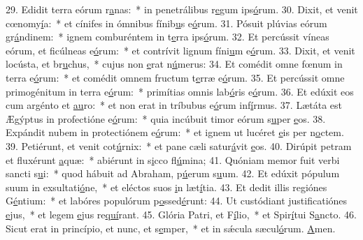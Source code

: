 29. Edidit terra eórum r\uline{a}nas:~* in penetrálibus r\uline{e}gum ips\uline{ó}rum.
30. Dixit, et venit cœnomy\uline{í}a:~* et cínifes in ómnibus fínib\uline{u}s e\uline{ó}rum.
31. Pósuit plúvias eórum gr\uline{á}ndinem:~* ignem comburéntem in t\uline{e}rra ips\uline{ó}rum.
32. Et percússit víneas eórum, et ficúlneas e\uline{ó}rum:~* et contrívit lignum fíni\uline{u}m e\uline{ó}rum.
33. Dixit, et venit locústa, et br\uline{u}chus,~* cujus non \uline{e}rat n\uline{ú}merus:
34. Et comédit omne fœnum in terra e\uline{ó}rum:~* et comédit omnem fructum t\uline{e}rræ e\uline{ó}rum.
35. Et percússit omne primogénitum in terra e\uline{ó}rum:~* primítias omnis lab\uline{ó}ris e\uline{ó}rum.
36. Et edúxit eos cum argénto et \uline{au}ro:~* et non erat in tríbubus e\uline{ó}rum inf\uline{í}rmus.
37. Lætáta est Ægýptus in profectióne e\uline{ó}rum:~* quia incúbuit timor eórum s\uline{u}per \uline{e}os.
38. Expándit nubem in protectiónem e\uline{ó}rum:~* et ignem ut lucéret \uline{e}is per n\uline{o}ctem.
39. Petiérunt, et venit cot\uline{ú}rnix:~* et pane cæli satur\uline{á}vit \uline{e}os.
40. Dirúpit petram et fluxérunt \uline{a}quæ:~* abiérunt in s\uline{i}cco fl\uline{ú}mina;
41. Quóniam memor fuit verbi sancti s\uline{u}i:~* quod hábuit ad Abraham, p\uline{ú}erum s\uline{u}um.
42. Et edúxit pópulum suum in exsultati\uline{ó}ne,~* et eléctos suos \uline{i}n læt\uline{í}tia.
43. Et dedit illis regiónes G\uline{é}ntium:~* et labóres populórum p\uline{o}ssed\uline{é}runt:
44. Ut custódiant justificatiónes \uline{e}jus,~* et legem \uline{e}jus re\uline{quí}rant.
45. Glória Patri, et F\uline{í}lio,~* et Spir\uline{í}tui S\uline{a}ncto.
46. Sicut erat in princípio, et nunc, et s\uline{e}mper,~* et in sǽcula sæcul\uline{ó}rum. \uline{A}men.
